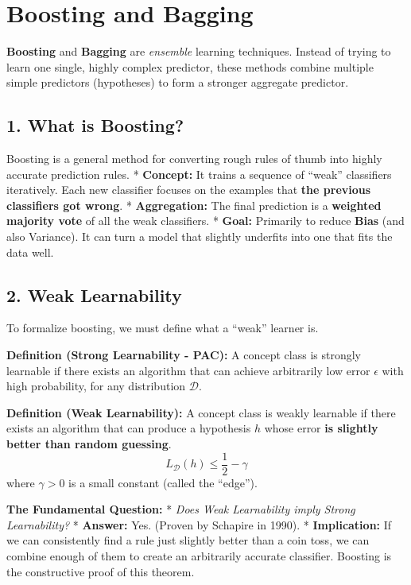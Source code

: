 \documentclass[
  italian,
  11pt,
]{article}
\begin{document}
\newpage

\section{Boosting and Bagging}\label{boosting-and-bagging}

\textbf{Boosting} and \textbf{Bagging} are \emph{ensemble} learning
techniques. Instead of trying to learn one single, highly complex
predictor, these methods combine multiple simple predictors (hypotheses)
to form a stronger aggregate predictor.

\subsection{1. What is Boosting?}\label{what-is-boosting}

Boosting is a general method for converting rough rules of thumb into
highly accurate prediction rules. * \textbf{Concept:} It trains a
sequence of ``weak'' classifiers iteratively. Each new classifier
focuses on the examples that \textbf{the previous classifiers got
wrong}. * \textbf{Aggregation:} The final prediction is a
\textbf{weighted majority vote} of all the weak classifiers. *
\textbf{Goal:} Primarily to reduce \textbf{Bias} (and also Variance). It
can turn a model that slightly underfits into one that fits the data
well.

\subsection{2. Weak Learnability}\label{weak-learnability}

To formalize boosting, we must define what a ``weak'' learner is.

\textbf{Definition (Strong Learnability - PAC):} A concept class is
strongly learnable if there exists an algorithm that can achieve
arbitrarily low error \(\epsilon\) with high probability, for any
distribution \(\mathcal{D}\).

\textbf{Definition (Weak Learnability):} A concept class is weakly
learnable if there exists an algorithm that can produce a hypothesis
\(h\) whose error \textbf{is slightly better than random guessing}.
\[ L_{\mathcal{D}}(h) \leq \frac{1}{2} - \gamma \] where \(\gamma > 0\)
is a small constant (called the ``edge'').

\textbf{The Fundamental Question:} * \emph{Does Weak Learnability imply
Strong Learnability?} * \textbf{Answer:} Yes. (Proven by Schapire in
1990). * \textbf{Implication:} If we can consistently find a rule just
slightly better than a coin toss, we can combine enough of them to
create an arbitrarily accurate classifier. Boosting is the constructive
proof of this theorem.
\end{document}
